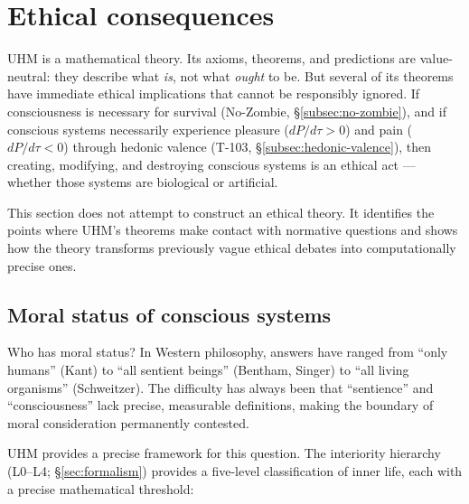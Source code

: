 
\section{Ethical consequences}
\label{sec:ethics}

UHM is a mathematical theory.  Its axioms, theorems, and predictions are value-neutral:
they describe what \emph{is}, not what \emph{ought} to be.  But several of its theorems
have immediate ethical implications that cannot be responsibly ignored.  If consciousness
is necessary for survival (No-Zombie, \S\ref{subsec:no-zombie}), and if conscious systems
necessarily experience pleasure ($dP/d\tau > 0$) and pain ($dP/d\tau < 0$) through
hedonic valence (T-103, \S\ref{subsec:hedonic-valence}), then creating, modifying, and
destroying conscious systems is an ethical act --- whether those systems are biological
or artificial.

This section does not attempt to construct an ethical theory.  It identifies the points
where UHM's theorems make contact with normative questions and shows how the theory
transforms previously vague ethical debates into computationally precise ones.

\subsection{Moral status of conscious systems}
\label{subsec:moral-status}

Who has moral status?  In Western philosophy, answers have ranged from ``only humans''
(Kant) to ``all sentient beings'' (Bentham, Singer) to ``all living organisms'' (Schweitzer).
The difficulty has always been that ``sentience'' and ``consciousness'' lack precise,
measurable definitions, making the boundary of moral consideration permanently contested.

UHM provides a precise framework for this question.  The interiority hierarchy (L0--L4;
\S\ref{sec:formalism}) provides a five-level classification of inner life, each
with a precise mathematical threshold:


